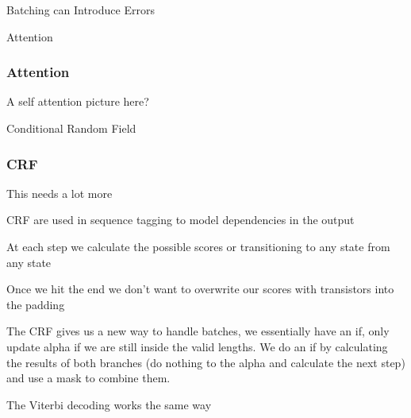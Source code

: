 \documentclass{beamer}
\begin{document}
\begin{section}{Batching can Introduce Errors}
\begin{subsection}{Attention}
        \begin{frame}
            \frametitle{Attention}

            A self attention picture here?

        \end{frame}

    \end{subsection} %

    \begin{subsection}{Conditional Random Field}

        \begin{frame}
            \frametitle{CRF}

            This needs a lot more

            CRF are used in sequence tagging to model dependencies in the output

            At each step we calculate the possible scores or transitioning to any state from any state

            Once we hit the end we don't want to overwrite our scores with transistors into the padding

            The CRF gives us a new way to handle batches, we essentially have an if, only update alpha if we are still
            inside the valid lengths. We do an if by calculating the results of both branches (do nothing to the alpha
            and calculate the next step) and use a mask to combine them.

            The Viterbi decoding works the same way


\end{frame}
\end{subsection}
\end{section}
\end{document}
